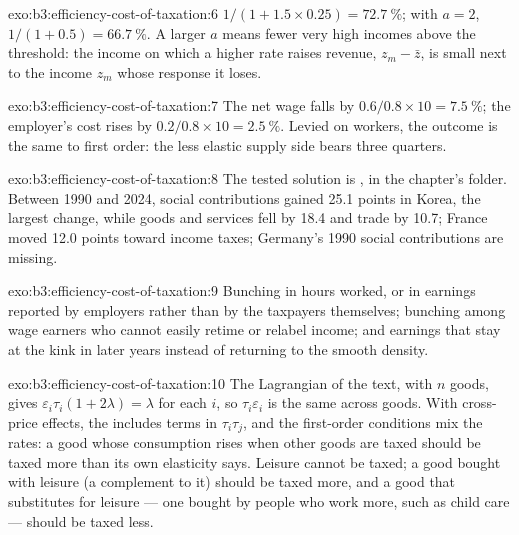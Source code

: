 \begin{solution}{exo:b3:efficiency-cost-of-taxation:6}
$1/(1 + 1.5 \times 0.25) = 72.7~\%$; with $a = 2$, $1/(1 + 0.5) = 66.7~\%$. A larger $a$ means fewer very high
incomes above the threshold: the income on which a higher rate raises revenue,
$z_m - \bar z$, is small next to the income $z_m$ whose response it loses.
\end{solution}

\begin{solution}{exo:b3:efficiency-cost-of-taxation:7}
The net wage falls by $0.6/0.8 \times 10 = 7.5~\%$; the employer's cost rises by $0.2/0.8 \times 10 = 2.5~\%$.
Levied on workers, the outcome is the same to first order: the less elastic supply
side bears three quarters.
\end{solution}

\begin{solution}{exo:b3:efficiency-cost-of-taxation:8}
The tested solution is , in the chapter's 
folder. Between 1990 and 2024, social contributions gained 25.1 points in Korea, the
largest change, while goods and services fell by 18.4 and trade by 10.7; France
moved 12.0 points toward income taxes; Germany's 1990 social contributions are
missing. %
\end{solution}

\begin{solution}{exo:b3:efficiency-cost-of-taxation:9}
Bunching in hours worked, or in earnings reported by employers rather than by the
taxpayers themselves; bunching among wage earners who cannot easily retime or
relabel income; and earnings that stay at the kink in later years instead of
returning to the smooth density.
\end{solution}

\begin{solution}{exo:b3:efficiency-cost-of-taxation:10}
The Lagrangian of the text, with $n$ goods, gives $\varepsilon_i\tau_i(1 + 2\lambda) = \lambda$ for each $i$, so $\tau_i\varepsilon_i$ is
the same across goods. With cross-price effects, the  includes terms in
$\tau_i\tau_j$, and the first-order conditions mix the rates: a good whose consumption rises
when other goods are taxed should be taxed more than its own elasticity says. Leisure
cannot be taxed; a good bought with leisure (a complement to it) should be taxed
more, and a good that substitutes for leisure --- one bought by people who work
more, such as child care --- should be taxed less.
\end{solution}

